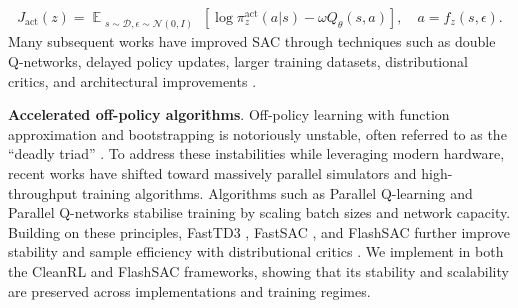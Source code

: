 \documentclass{article} %
\DeclareMathOperator*{\E}{\mathbb{E}}
\newcommand\expectwrt[2]{\E_{#2}\left[ #1 \right]}
\begin{document}
            \begin{equation}
                \label{equ:sac_policy_loss_actor}
                J_{\text{act}}(z) = \expectwrt{\log \pi^\text{act}_{z}(a|s) - \omega Q_\theta(s,a) }{\substack{s \sim \mathcal{D}, \epsilon \sim \mathcal{N}(0, I)}}, \quad a = f_z(s, \epsilon).
            \end{equation}
            Many subsequent works have improved SAC through techniques such as double Q-networks, delayed policy updates, larger training datasets, distributional critics, and architectural improvements \citep{haarnoja2018SAC_2, seo2025learning_fastsac, kim2026flashsac}.


        \textbf{Accelerated off-policy algorithms}.
            Off-policy learning with function approximation and bootstrapping is notoriously unstable, often referred to as the ``deadly triad'' \citep{van2018deep_rl_deadly_triad}. To address these instabilities while leveraging modern hardware, recent works have shifted toward massively parallel simulators \citep{Mittal_Isaac_Lab_2025, genesis2026genesisworld} and high-throughput training algorithms. Algorithms such as Parallel Q-learning \citep{li2023parallel_PQL} and Parallel Q-networks \citep{gallici2025simplifying_pqn} stabilise training by scaling batch sizes and network capacity. Building on these principles, FastTD3 \citep{seo2025fasttd3}, FastSAC \citep{seo2025learning_fastsac}, and FlashSAC \citep{kim2026flashsac} further improve stability and sample efficiency with distributional critics \citep{bellemare2017distributional}. We implement \ourMethod in both the CleanRL \citep{huang2022cleanrl} and FlashSAC frameworks, showing that its stability and scalability are preserved across implementations and training regimes.
            
            
            
            

            
\end{document}
